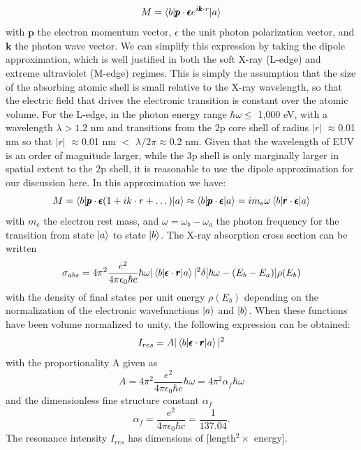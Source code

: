 \begin{equation}
M = \braket{b| \pmb{p}\cdot \pmb{\epsilon} e^{i\pmb{k}\cdot r}|a}
\end{equation}
with $\pmb{p}$ the electron momentum vector, $\epsilon$ the unit photon polarization vector, and $\pmb{k}$ the photon wave vector. We can simplify this expression by taking the dipole approximation, which is well justified in both the soft X-ray (L-edge) and extreme ultraviolet (M-edge) regimes. This is simply the assumption that the size of the absorbing atomic shell is small relative to the X-ray wavelength, so that the electric field that drives the electronic transition is constant over the atomic volume. For the L-edge, in the photon energy range $\hbar\omega\leq$ 1,000 eV, with a wavelength $\lambda>1.2$ nm and transitions from the 2p core shell of radius $|r|$ $\approx$0.01 nm so that $|r|$ $\approx$0.01 nm $<$ $\lambda/2\pi\approx$0.2 nm. Given that the wavelength of EUV is an order of magnitude larger, while the 3p shell is only marginally larger in spatial extent to the 2p shell, it is reasonable to use the dipole approximation for our discussion here. In this approximation we have:
\begin{equation}
M = \braket{b|\pmb{p}\cdot\pmb{\epsilon}(1+ik\cdot r + \dots)|a} \approx \braket{b|\pmb{p}\cdot \pmb{\epsilon} |a} = i m_e \omega \braket{b|\pmb{r} \cdot \pmb{\epsilon} |a}
\end{equation}
with $m_e$ the electron rest mass, and $\omega=\omega_b-\omega_a$ the photon frequency for the transition from state $\ket{a}$ to state $\ket{b}$. The X-ray absorption cross section can be written
\begin{equation}
\sigma_{abs} = 4\pi^2\frac{e^2}{4\pi\epsilon_0\hbar c}\hbar \omega |\braket{b|\pmb{\epsilon}\cdot \pmb{r}|a}|^2\delta[\hbar\omega-(E_b-E_a)]\rho(E_b)
\end{equation}
with the density of final states per unit energy $\rho(E_b)$ depending on the normalization of the electronic wavefunctions $\ket{a}$ and $\ket{b}$. When these functions have been volume normalized to unity, the following expression can be obtained:
\begin{equation}
I_{res} = A|\braket{b|\pmb{\epsilon} \cdot \pmb{r}|a}|^2
\end{equation}
with the proportionality A given as
\begin{equation}
A=4\pi^2\frac{e^2}{4\pi\epsilon_0\hbar c}\hbar\omega = 4\pi^2 \alpha_f \hbar \omega
\end{equation}
and the dimensionless fine structure constant $\alpha_f$
\begin{equation}
\alpha_f=\frac{e^2}{4\pi\epsilon_0\hbar c} = \frac{1}{137.04}.
\end{equation}
The resonance intensity $I_{res}$ has dimensions of [length$^2 \times$ energy].

